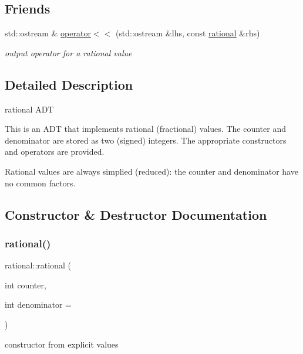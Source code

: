 \subsection*{Friends}
\begin{DoxyCompactItemize}
\item 
std\+::ostream \& \hyperlink{classrational_a5b7c78fca4537715369ba7da02abb4df}{operator$<$$<$} (std\+::ostream \&lhs, const \hyperlink{classrational}{rational} \&rhs)
\begin{DoxyCompactList}\small\item\em output operator for a rational value \end{DoxyCompactList}\end{DoxyCompactItemize}


\subsection{Detailed Description}
rational A\+DT 

This is an A\+DT that implements rational (fractional) values. The counter and denominator are stored as two (signed) integers. The appropriate constructors and operators are provided.

Rational values are always simplied (reduced)\+: the counter and denominator have no common factors. 

\subsection{Constructor \& Destructor Documentation}
\mbox{\label{classrational_a5f971ef33181044f54d8e4fee71cb957}} 
\subsubsection{\texorpdfstring{rational()}{rational()}}
{\footnotesize\ttfamily rational\+::rational (\begin{DoxyParamCaption}\item[{int}]{counter,  }\item[{int}]{denominator = {} }\end{DoxyParamCaption})\hspace{0.3cm}{\ttfamily [inline]}}



constructor from explicit values 

